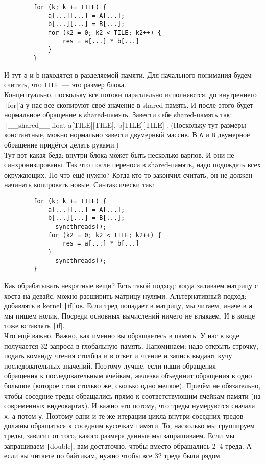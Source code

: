 \documentclass{article}
\begin{document}
    \begin{verbatim}
        for (k; k += TILE) {
            a[...][...] = A[...];
            b[...][...] = B[...];
            for (k2 = 0; k2 < TILE; k2++) {
                res = a[...] * b[...]
            }
        }
    \end{verbatim}
    И тут \Verb|a| и \Verb|b| находятся в разделяемой памяти. Для начального понимания будем считать, что \Verb|TILE|~--- это размер блока.\\
    Концептуально, поскольку все потоки параллельно исполняются, до внутреннего \texttt|for|'а у нас все скопируют своё значение в shared-память. И после этого будет нормальное обращение в shared-память. Завести себе shared-память так: \texttt|__shared__ float a[TILE][TILE], b[TILE][TILE]|. (Поскольку тут размеры константные, можно нормально завести двумерный массив. В \Verb|A| и \Verb|B| двумерное обращение придётся делать руками.)\\
    Тут вот какая беда: внутри блока может быть несколько варпов. И они не синхронизированы. Так что после переноса в shared-память, надо подождать всех окружающих. Но что ещё нужно? Когда кто-то закончил считать, он не должен начинать копировать новые. Синтаксически так:
    \begin{verbatim}
        for (k; k += TILE) {
            a[...][...] = A[...];
            b[...][...] = B[...];
            __syncthreads();
            for (k2 = 0; k2 < TILE; k2++) {
                res = a[...] * b[...]
            }
            __syncthreads();
        }
    \end{verbatim}
    Как обрабатывать некратные вещи? Есть такой подход: когда заливаем матрицу с хоста на девайс, можно расширить матрицу нулями. Альтернативный подход: добавлять в kernel \texttt|if|'ов. Если тред попадает в матрицу, мы читаем, иначе в \Verb|a| мы пишем нолик. Посреди основных вычислений ничего не втыкаем. И в конце тоже вставлять \texttt|if|.\\
    Что ещё важно. Важно, как именно вы обращаетесь в память. У нас в коде получается 32 запроса в глобальную память. Напоминаем: надо открыть строчку, подать команду чтения столбца и в ответ и чтение и запись выдают кучу последовательных значений. Поэтому лучше, если наши обращения~--- обращения к последовательным ячейкам, железка объединит обращения в одно большое (которое стои столько же, сколько одно мелкое). Причём не обязательно, чтобы соседние треды обращались прямо к соответствующим ячейкам памяти (на современных видеокартах). И важно это потому, что треды нумеруются сначала \Verb|x|, а потом \Verb|y|. Поэтому одни и те же итерации цикла внутри соседних тредов должны обращаться к соседним кусочкам памяти. То, насколько мы группируем треды, зависит от того, какого размера данные мы запрашиваем. Если мы запрашиваем \texttt|double|, вам достаточно, чтобы вместо обращались 2--4 треда. А если вы читаете по байтикам, нужно чтобы все 32 треда были рядом.\\
\end{document}
